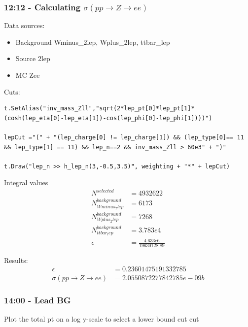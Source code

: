 \subsubsection*{12:12 - Calculating $\sigma(pp \rightarrow Z \rightarrow ee)$}
Data sources: 
\begin{itemize}
    \item Background
    \subitem Wminus\_2lep, Wplus\_2lep, ttbar\_lep
    \item Source
    \subitem 2lep
    \item MC 
    \subitem Zee
\end{itemize}

Cuts:
\begin{lstlisting}
t.SetAlias("inv_mass_Zll","sqrt(2*lep_pt[0]*lep_pt[1]*(cosh(lep_eta[0]-lep_eta[1])-cos(lep_phi[0]-lep_phi[1])))")
    
lepCut ="(" + "(lep_charge[0] != lep_charge[1]) && (lep_type[0]== 11 && lep_type[1] == 11) && lep_n==2 && inv_mass_Zll > 60e3" + ")"    
  
t.Draw("lep_n >> h_lep_n(3,-0.5,3.5)", weighting + "*" + lepCut)
\end{lstlisting}

Integral values
\begin{align}
    N^{selected} &= 4932622
    \\
    N^{background}_{Wminus_2lep} &= 6173
    \\
    N^{background}_{Wplus_2lep} &= 7268
    \\
    N^{background}_{ttbar_lep} &= 3.783e4
    \\
    \epsilon &= \frac{4.633e6}{19630128.89}
\end{align}

Results:
\begin{align}
    \epsilon &= 0.23601475191332785
    \\
    \sigma (pp \rightarrow Z \rightarrow ee) &= 2.0550872277842785e-09 b
\end{align}



\subsubsection*{14:00 - Lead BG}
Plot the total pt on a log y-scale to select a lower bound cut cut 

